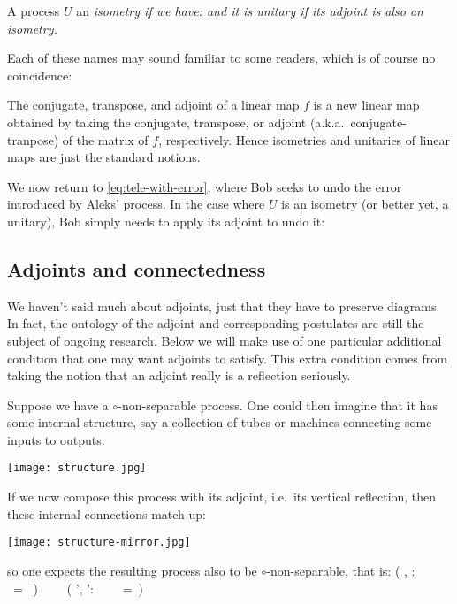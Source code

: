 \documentclass[10pt]{article}
\begin{document}
\begin{definition}
A process $U$ an \em isometry \em if we have:     
\beq\label{eq:isometry}
\eeq
and it is \em unitary \em if its adjoint is also an isometry.    
\end{definition}

Each of these names may sound familiar to  some readers, which is of course no coincidence: 

\begin{example}
  The conjugate, transpose, and adjoint of a linear map $f$ is a new linear map obtained by taking the conjugate, transpose, or adjoint (a.k.a.~conjugate-tranpose) of the matrix of $f$, respectively. Hence isometries and unitaries of linear maps are just the standard notions.
\end{example}

We now return to \eqref{eq:tele-with-error}, where Bob seeks to undo the error introduced by Aleks' process. In the case where $U$ is an isometry (or better yet, a unitary), Bob simply needs to apply its adjoint to undo it:

\subsection{Adjoints and connectedness} 

We haven't said much about adjoints, just that they have to preserve diagrams.  In fact, the ontology of the adjoint and corresponding postulates are still the subject of ongoing research.  Below we will make use of one particular additional condition  that one may want  adjoints to satisfy.  This extra condition comes from taking the notion that an adjoint really is a reflection seriously.

Suppose we have a $\circ$-non-separable process.  One could then imagine  that it has some internal structure, say a collection of tubes or machines connecting some inputs to outputs: 
\begin{center}
  \texttt{[image: structure.jpg]}
\end{center}
If we now compose this process with its adjoint, i.e.~its vertical reflection, then these internal  connections match up:
\begin{center}
  \texttt{[image: structure-mirror.jpg]}
\end{center}
so one expects the resulting process also to be $\circ$-non-separable, that is:
\beq\label{EQ:daggeraxiom}
\left( \exists \psi, \phi: \ \  \ =\ \kpointketbra{\psi}{\phi} \right)
  \ \ \Longleftrightarrow\ \
 \left( \exists \psi', \phi':  \ \   \ \ =\ \right)  
\eeq
\end{document}
